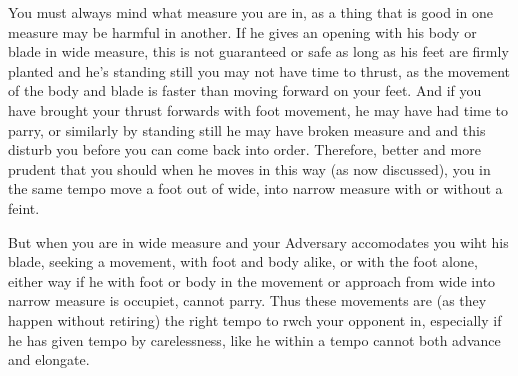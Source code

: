 \newpage


\newpage


You must always mind what measure you are in, as a thing that is good
in one measure may be harmful in another. If he gives an opening with
his body or blade in wide measure, this is not guaranteed or safe as
long as his feet are firmly planted and he's standing still you may
not have time to thrust, as the movement of the body and blade is
faster than moving forward on your feet. And if you have brought your
thrust forwards with foot movement, he may have had time to parry, or
similarly by standing still he may have broken measure and and this
disturb you before you can come back into order. Therefore, better 
and more prudent that you should when he moves in this way (as now
discussed), you in the same tempo move a foot out of wide, into
narrow measure with or without a feint.


But when you are in wide measure and your Adversary accomodates you
wiht his blade, seeking a movement, with foot and body alike, or with
the foot alone, either way if he with foot or body in the movement or
approach from wide into narrow measure is occupiet, cannot parry. Thus
these movements are (as they happen without retiring) the right tempo
to rwch your opponent in, especially if he has given tempo by
carelessness, like he within a tempo cannot both advance and elongate.

